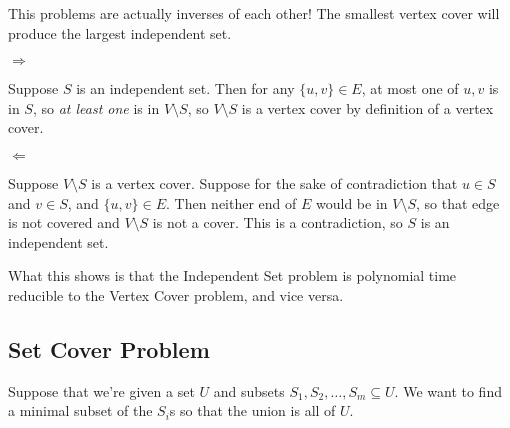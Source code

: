 \documentclass[12pt]{article}
\begin{document}

  This problems are actually inverses of each other! The smallest vertex cover
  will produce the largest independent set.

  {
    $\Rightarrow$

    Suppose $S$ is an independent set. Then for any $\{u, v\} \in E$, at most
    one of $u, v$ is in $S$, so {\it at least one} is in $V \setminus S$, so $V
    \setminus S$ is a vertex cover by definition of a vertex cover.

    $\Leftarrow$

    Suppose $V \setminus S$ is a vertex cover. Suppose for the sake of
    contradiction that $u \in S$ and $v \in S$, and $\{u, v\} \in E$. Then
    neither end of $E$ would be in $V \setminus S$, so that edge is not covered
    and $V \setminus S$ is not a cover. This is a contradiction, so $S$ is an
    independent set.
  }


  What this shows is that the Independent Set problem is polynomial time
  reducible to the Vertex Cover problem, and vice versa.

  \subsection{Set Cover Problem}

  Suppose that we're given a set $U$ and subsets $S_1, S_2, \dots, S_m \subseteq
  U$. We want to find a minimal subset of the $S_i$s so that the union is all of
  $U$.
\end{document}
